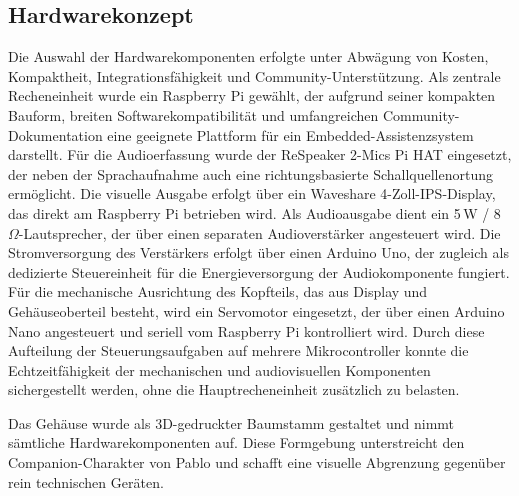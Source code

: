 \subsection{Hardwarekonzept}
Die Auswahl der Hardwarekomponenten erfolgte unter Abwägung von Kosten, Kompaktheit, Integrationsfähigkeit und Community-Unterstützung.
Als zentrale Recheneinheit wurde ein Raspberry Pi gewählt, der aufgrund seiner kompakten Bauform, breiten Softwarekompatibilität und umfangreichen Community-Dokumentation eine geeignete Plattform für ein Embedded-Assistenzsystem darstellt.
Für die Audioerfassung wurde der ReSpeaker 2-Mics Pi HAT eingesetzt, der neben der Sprachaufnahme auch eine richtungsbasierte Schallquellenortung ermöglicht.
Die visuelle Ausgabe erfolgt über ein Waveshare 4-Zoll-IPS-Display, das direkt am Raspberry Pi betrieben wird.
Als Audioausgabe dient ein 5\,W / 8\,$\Omega$-Lautsprecher, der über einen separaten Audioverstärker angesteuert wird.
Die Stromversorgung des Verstärkers erfolgt über einen Arduino Uno, der zugleich als dedizierte Steuereinheit für die Energieversorgung der Audiokomponente fungiert.
Für die mechanische Ausrichtung des Kopfteils, das aus Display und Gehäuseoberteil besteht, wird ein Servomotor eingesetzt, der über einen Arduino Nano angesteuert und seriell vom Raspberry Pi kontrolliert wird.
Durch diese Aufteilung der Steuerungsaufgaben auf mehrere Mikrocontroller konnte die Echtzeitfähigkeit der mechanischen und audiovisuellen Komponenten sichergestellt werden, ohne die Hauptrecheneinheit zusätzlich zu belasten.

Das Gehäuse wurde als 3D-gedruckter Baumstamm gestaltet und nimmt sämtliche Hardwarekomponenten auf.
Diese Formgebung unterstreicht den Companion-Charakter von Pablo und schafft eine visuelle Abgrenzung gegenüber rein technischen Geräten.